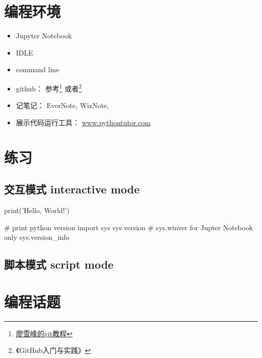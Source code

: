 \section{编程环境}
\begin{itemize}
\item Jupyter Notebook
\item IDLE
\item command line
\item github： 参考\footnote{\protect\href{https://www.liaoxuefeng.com/wiki/0013739516305929606dd18361248578c67b8067c8c017b000}{廖雪峰的git教程}} 或者\footnote{《GitHub入门与实践》}
\item 记笔记： EverNote, WizNote, 
\item 展示代码运行工具： \url{www.pythontutor.com}
\end{itemize}

\section{练习}
\subsection{交互模式 interactive mode}


\begin{python}
  print('Hello, World!')

  # print python version
  import sys
  sys.version
  # sys.winver for Jupter Notebook only
  sys.version_info
\end{python}

\subsection{脚本模式 script mode}

\section{编程话题}

